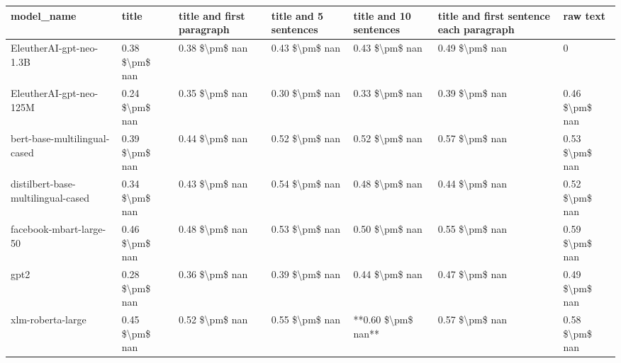 \begin{tabular}{lllllll}
\toprule
                        model\_name &          title & title and first paragraph & title and 5 sentences & title and 10 sentences & title and first sentence each paragraph &       raw text \\
\midrule
           EleutherAI-gpt-neo-1.3B & 0.38 \$\textbackslash pm\$ nan &            0.38 \$\textbackslash pm\$ nan &        0.43 \$\textbackslash pm\$ nan &         0.43 \$\textbackslash pm\$ nan &                          0.49 \$\textbackslash pm\$ nan &              0 \\
           EleutherAI-gpt-neo-125M & 0.24 \$\textbackslash pm\$ nan &            0.35 \$\textbackslash pm\$ nan &        0.30 \$\textbackslash pm\$ nan &         0.33 \$\textbackslash pm\$ nan &                          0.39 \$\textbackslash pm\$ nan & 0.46 \$\textbackslash pm\$ nan \\
      bert-base-multilingual-cased & 0.39 \$\textbackslash pm\$ nan &            0.44 \$\textbackslash pm\$ nan &        0.52 \$\textbackslash pm\$ nan &         0.52 \$\textbackslash pm\$ nan &                          0.57 \$\textbackslash pm\$ nan & 0.53 \$\textbackslash pm\$ nan \\
distilbert-base-multilingual-cased & 0.34 \$\textbackslash pm\$ nan &            0.43 \$\textbackslash pm\$ nan &        0.54 \$\textbackslash pm\$ nan &         0.48 \$\textbackslash pm\$ nan &                          0.44 \$\textbackslash pm\$ nan & 0.52 \$\textbackslash pm\$ nan \\
           facebook-mbart-large-50 & 0.46 \$\textbackslash pm\$ nan &            0.48 \$\textbackslash pm\$ nan &        0.53 \$\textbackslash pm\$ nan &         0.50 \$\textbackslash pm\$ nan &                          0.55 \$\textbackslash pm\$ nan & 0.59 \$\textbackslash pm\$ nan \\
                              gpt2 & 0.28 \$\textbackslash pm\$ nan &            0.36 \$\textbackslash pm\$ nan &        0.39 \$\textbackslash pm\$ nan &         0.44 \$\textbackslash pm\$ nan &                          0.47 \$\textbackslash pm\$ nan & 0.49 \$\textbackslash pm\$ nan \\
                 xlm-roberta-large & 0.45 \$\textbackslash pm\$ nan &            0.52 \$\textbackslash pm\$ nan &        0.55 \$\textbackslash pm\$ nan &     **0.60 \$\textbackslash pm\$ nan** &                          0.57 \$\textbackslash pm\$ nan & 0.58 \$\textbackslash pm\$ nan \\
\bottomrule
\end{tabular}
